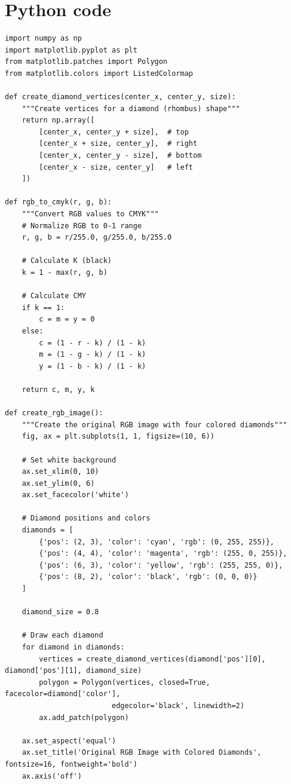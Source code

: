 \documentclass{article}
\begin{document}
\clearpage
\section*{Python code}
\begin{lstlisting}
import numpy as np
import matplotlib.pyplot as plt
from matplotlib.patches import Polygon
from matplotlib.colors import ListedColormap

def create_diamond_vertices(center_x, center_y, size):
    """Create vertices for a diamond (rhombus) shape"""
    return np.array([
        [center_x, center_y + size],  # top
        [center_x + size, center_y],  # right
        [center_x, center_y - size],  # bottom
        [center_x - size, center_y]   # left
    ])

def rgb_to_cmyk(r, g, b):
    """Convert RGB values to CMYK"""
    # Normalize RGB to 0-1 range
    r, g, b = r/255.0, g/255.0, b/255.0
    
    # Calculate K (black)
    k = 1 - max(r, g, b)
    
    # Calculate CMY
    if k == 1:
        c = m = y = 0
    else:
        c = (1 - r - k) / (1 - k)
        m = (1 - g - k) / (1 - k)
        y = (1 - b - k) / (1 - k)
    
    return c, m, y, k

def create_rgb_image():
    """Create the original RGB image with four colored diamonds"""
    fig, ax = plt.subplots(1, 1, figsize=(10, 6))
    
    # Set white background
    ax.set_xlim(0, 10)
    ax.set_ylim(0, 6)
    ax.set_facecolor('white')
    
    # Diamond positions and colors
    diamonds = [
        {'pos': (2, 3), 'color': 'cyan', 'rgb': (0, 255, 255)},
        {'pos': (4, 4), 'color': 'magenta', 'rgb': (255, 0, 255)},
        {'pos': (6, 3), 'color': 'yellow', 'rgb': (255, 255, 0)},
        {'pos': (8, 2), 'color': 'black', 'rgb': (0, 0, 0)}
    ]
    
    diamond_size = 0.8
    
    # Draw each diamond
    for diamond in diamonds:
        vertices = create_diamond_vertices(diamond['pos'][0], diamond['pos'][1], diamond_size)
        polygon = Polygon(vertices, closed=True, facecolor=diamond['color'], 
                         edgecolor='black', linewidth=2)
        ax.add_patch(polygon)
    
    ax.set_aspect('equal')
    ax.set_title('Original RGB Image with Colored Diamonds', fontsize=16, fontweight='bold')
    ax.axis('off')
    

\end{lstlisting}
\end{document}

